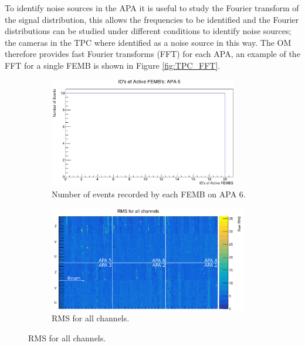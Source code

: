 To identify noise sources in the APA it is useful to study the Fourier transform
of the signal distribution, this allows the frequencies to be identified and the
Fourier distributions can be studied under different conditions to identify
noise sources; the cameras in the TPC where identified as a noise source in
this way. The OM therefore provides fast Fourier transforms (FFT) for each
APA, an example of the FFT for a single FEMB is shown in Figure
\ref{fig:TPC_FFT}.

\begin{figure}

	\centering

	\begin{subfigure}[b]{0.85\textwidth}
		\centering
		\includegraphics[width=0.9\textwidth]{figures/active_femb.pdf}
		\caption {Number of events recorded by each FEMB on APA 6.}
		\label{fig:active_femb}
	\end{subfigure}

	\begin{subfigure}[b]{0.85\textwidth}
		\raggedleft
		\vspace{3mm}
		\includegraphics[width=0.95\textwidth]{figures/all_chan_rms.png}
		\caption {RMS for all channels.} 
		\label{fig:ped_noise}
	\end{subfigure}


\end{figure}
